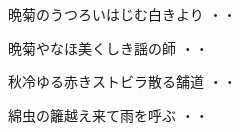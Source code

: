 \vspace{0.4cm}
\begin{shiika}晩菊のうつろいはじむ白きより
\hfill{・・}\end{shiika}
\vspace{0.4cm}
\begin{shiika}晩菊やなほ美くしき謡の師
\hfill{・・}\end{shiika}
\vspace{0.4cm}
\begin{shiika}秋冷ゆる赤きストビラ散る舗道
\hfill{・・}\end{shiika}
\vspace{0.4cm}
\begin{shiika}綿虫の籬越え来て雨を呼ぶ
\hfill{・・}\end{shiika}